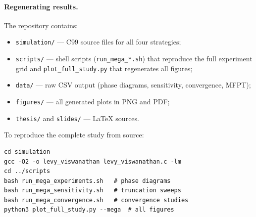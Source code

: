 \paragraph{Regenerating results.}
The repository contains:
\begin{itemize}
  \item \texttt{simulation/} --- C99 source files for all four strategies;
  \item \texttt{scripts/} --- shell scripts (\texttt{run\_mega\_*.sh}) that
        reproduce the full experiment grid and
        \texttt{plot\_full\_study.py} that regenerates all figures;
  \item \texttt{data/} --- raw CSV output (phase diagrams, sensitivity,
        convergence, MFPT);
  \item \texttt{figures/} --- all generated plots in PNG and PDF;
  \item \texttt{thesis/} and \texttt{slides/} --- \LaTeX{} sources.
\end{itemize}
To reproduce the complete study from source:
\begin{verbatim}
cd simulation
gcc -O2 -o levy_viswanathan levy_viswanathan.c -lm
cd ../scripts
bash run_mega_experiments.sh   # phase diagrams
bash run_mega_sensitivity.sh   # truncation sweeps
bash run_mega_convergence.sh   # convergence studies
python3 plot_full_study.py --mega  # all figures
\end{verbatim}